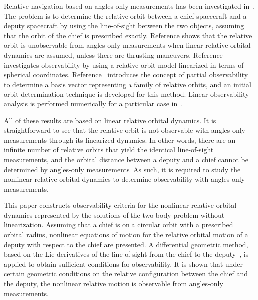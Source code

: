 Relative navigation based on angles-only measurements has been investigated in~\cite{WofGelITAES09,Tom11,PatLovPASFMM12}.  The problem is to determine the relative orbit between a chief spacecraft and a deputy spacecraft by using the line-of-sight between the two objects, assuming that the orbit of the chief is prescribed exactly.  Reference \cite{WofGelITAES09} shows that the relative orbit is unobservable from angles-only measurements when linear relative orbital dynamics are assumed, unless there are thrusting maneuvers. Reference \cite{Tom11} investigates observability by using a relative orbit model linearized in terms of spherical coordinates.  Reference~\cite{PatLovPASFMM12} introduces the concept of partial observability to determine a basis vector representing a family of relative orbits, and an initial orbit determination technique is developed for this method. Linear observability analysis is performed numerically for a particular case in~\cite{YimCraPASMM04}. 

All of these results are based on linear relative orbital dynamics. It is straightforward to see that the relative orbit is not observable with angles-only measurements through its linearized dynamics. In other words, there are an infinite number of relative orbits that yield the identical line-of-sight measurements, and the orbital distance between a deputy and a chief cannot be determined by angles-only measurements. As such, it is required to study the nonlinear relative orbital dynamics to determine observability with angles-only measurements. 


This paper constructs observability criteria for the nonlinear relative orbital dynamics represented by the solutions of the two-body problem without linearization. Assuming that a chief is on a circular orbit with a prescribed orbital radius, nonlinear equations of motion for the relative orbital motion of a deputy with respect to the chief are presented.  A differential geometric method, based on the Lie derivatives of the line-of-sight from the chief to the deputy~\cite{HerKreITAC77}, is applied to obtain sufficient conditions for observability.  It is shown that under certain geometric conditions on the relative configuration between the chief and the deputy, the nonlinear relative motion is observable from angles-only measurements.  

